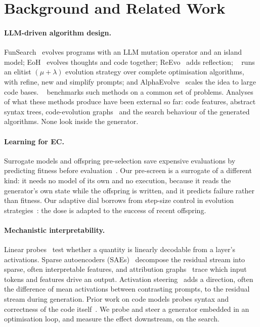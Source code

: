 \section{Background and Related Work}\label{sec:related}

\paragraph{LLM-driven algorithm design.}
FunSearch~\cite{romeraparedes2024funsearch} evolves programs with an LLM
mutation operator and an island model; EoH~\cite{liu2024eoh} evolves
thoughts and code together; ReEvo~\cite{ye2024reevo} adds reflection;
\llamea~\cite{vanstein2025llamea} runs an elitist
$(\mu+\lambda)$ evolution strategy over complete optimisation algorithms,
with refine, new and simplify prompts; and
AlphaEvolve~\cite{novikov2025alphaevolve} scales the idea to large code
bases. \blade~\cite{blade2025} benchmarks such methods on a common set of
problems. Analyses of what these methods produce have been external so
far: code features, abstract syntax trees, code-evolution
graphs~\cite{vanstein2025ceg} and the search behaviour of the generated
algorithms. None look inside the generator.

\paragraph{Learning for EC\@.}
Surrogate models and offspring pre-selection save expensive evaluations
by predicting fitness before evaluation~\cite{jin2011surrogate}. Our
pre-screen is a surrogate of a different kind: it needs no model of
its own and no execution, because it reads the generator's own state
while the offspring is written, and it predicts failure rather than
fitness. Our adaptive dial borrows from
step-size control in evolution strategies~\cite{rechenberg1973}: the
dose is adapted to the success of recent offspring.

\paragraph{Mechanistic interpretability.}
Linear probes~\cite{alain2016probes} test whether a quantity is linearly
decodable from a layer's activations. Sparse autoencoders
(SAEs)~\cite{bricken2023monosemanticity,cunningham2024sae} decompose the
residual stream into sparse, often interpretable features, and
attribution graphs~\cite{ameisen2025circuits} trace which input tokens
and features drive an output. Activation
steering~\cite{turner2023actadd,rimsky2024caa,zou2023repe} adds a
direction, often the difference of mean activations between contrasting
prompts, to the residual stream during generation. Prior work on code
models probes syntax and correctness of the code
itself~. We probe and steer a
generator embedded in an optimisation loop, and measure the effect
downstream, on the search.
